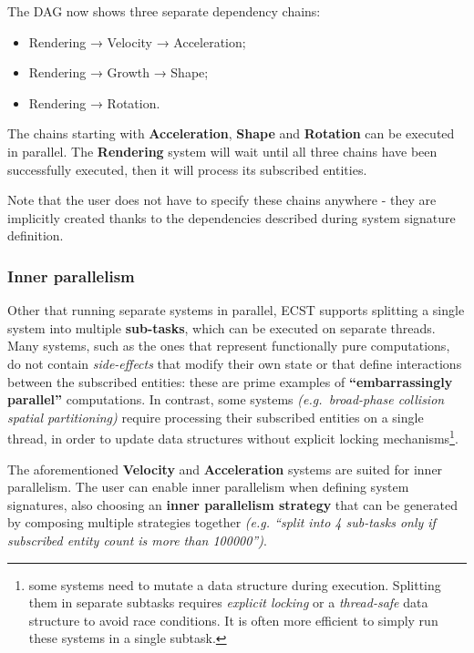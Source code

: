 \documentclass[twoside, 12pt, a4paper, openright]{book}
\begin{document}
The DAG now shows three separate dependency chains:

\begin{itemize}
\item
  Rendering → Velocity → Acceleration;
\item
  Rendering → Growth → Shape;
\item
  Rendering → Rotation.
\end{itemize}

The chains starting with \textbf{Acceleration}, \textbf{Shape} and
\textbf{Rotation} can be executed in parallel. The \textbf{Rendering}
system will wait until all three chains have been successfully executed,
then it will process its subscribed entities.

Note that the user does not have to specify these chains anywhere - they
are implicitly created thanks to the dependencies described during
system signature definition.

\subsubsection{Inner parallelism}\label{inner-parallelism}

Other that running separate systems in parallel, ECST supports splitting
a single system into multiple \textbf{sub-tasks}, which can be executed
on separate threads. Many systems, such as the ones that represent
functionally pure computations, do not contain \emph{side-effects} that
modify their own state or that define interactions between the
subscribed entities: these are prime examples of
\textbf{``embarrassingly parallel''} computations. In contrast, some
systems \emph{(e.g.~broad-phase collision spatial partitioning)} require
processing their subscribed entities on a single thread, in order to
update data structures without explicit locking mechanisms\footnote{some
  systems need to mutate a data structure during execution. Splitting
  them in separate subtasks requires \emph{explicit locking} or a
  \emph{thread-safe} data structure to avoid race conditions. It is
  often more efficient to simply run these systems in a single subtask.}.

The aforementioned \textbf{Velocity} and \textbf{Acceleration} systems
are suited for inner parallelism. The user can enable inner parallelism
when defining system signatures, also choosing an \textbf{inner
parallelism strategy} that can be generated by composing multiple
strategies together \emph{(e.g. ``split into 4 sub-tasks only if
subscribed entity count is more than 100000'')}.
\end{document}
